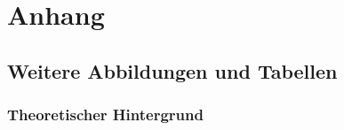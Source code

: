 \chapter{Anhang}
\section{Weitere Abbildungen und Tabellen}
\subsection{Theoretischer Hintergrund}{


}
